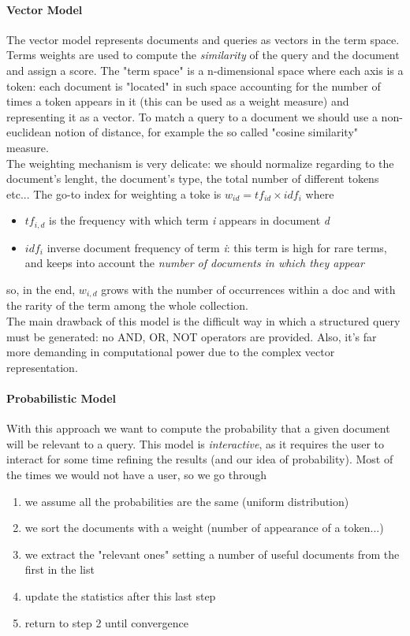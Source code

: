 \documentclass{article}
\begin{document}
				\paragraph{Vector Model}
					The vector model represents documents and queries as vectors in the term space. Terms weights are used to compute the \textit{similarity} of the query and the document and assign a score. The "term space" is a n-dimensional space where each axis is a token: each document is "located" in such space accounting for the number of times a token appears in it (this can be used as a weight measure) and representing it as a vector. To match a query to a document we should use a non-euclidean notion of distance, for example the so called "cosine similarity" measure.\\
					The weighting mechanism is very delicate: we should normalize regarding to the document's lenght, the document's type, the total number of different tokens etc... The go-to index for weighting a toke is $w_{id} = tf_{id} \times idf_{i}$ where
					\begin{itemize}
						\item $tf_{i, d}$ is the frequency with which term \emph{i} appears in document \emph{d}
						\item $idf_i$ inverse document frequency of term \emph{i}: this term is high for rare terms, and keeps into account the \textit{number of documents in which they appear}
					\end{itemize}
					so, in the end, $w_{i, d}$ grows with the number of occurrences within a doc and with the rarity of the term among the whole collection.\\
					The main drawback of this model is the difficult way in which a structured query must be generated: no AND, OR, NOT operators are provided. Also, it's far more demanding in computational power due to the complex vector representation.

				\paragraph{Probabilistic Model}
					With this approach we want to compute the probability that a given document will be relevant to a query. This model is \textit{interactive}, as it requires the user to interact for some time refining the results (and our idea of probability). Most of the times we would not have a user, so we go through
					\begin{enumerate}
						\item we assume all the probabilities are the same (uniform distribution)
						\item we sort the documents with a weight (number of appearance of a token...)
						\item we extract the "relevant ones" setting a number of useful documents from the first in the list
						\item update the statistics after this last step
						\item return to step 2 until convergence						
					\end{enumerate}
		
\end{document}
